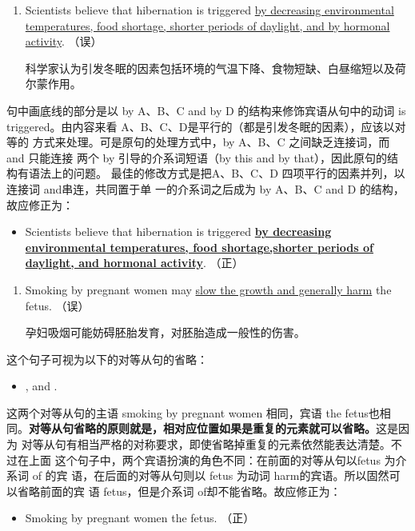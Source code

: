 \begin{enumerate}[resume]
\item Scientists believe that hibernation is triggered \uline{by decreasing
  environmental temperatures, food shortage, shorter periods of daylight,
  and by hormonal activity}. （误）

  科学家认为引发冬眠的因素包括环境的气温下降、食物短缺、白昼缩短以及荷尔蒙作用。
\end{enumerate}

句中画底线的部分是以 by A、B、C and by D 的结构来修饰宾语从句中的动词 is
triggered。由内容来看 A、B、C、D是平行的（都是引发冬眠的因素），应该以对等的
方式来处理。可是原句的处理方式中，by A、B、C 之间缺乏连接词，而 and 只能连接
两个 by 引导的介系词短语（by this and by that），因此原句的结构有语法上的问题。
最佳的修改方式是把A、B、C、D 四项平行的因素并列，以连接词 and串连，共同置于单
一的介系词之后成为 by A、B、C and D 的结构，故应修正为：
\begin{mybox}

\begin{itemize}
\item Scientists believe that hibernation is triggered \ul{\textbf{by decreasing
    environmental temperatures, food shortage,shorter periods of daylight,
    and hormonal activity}}. （正）
\end{itemize}
\end{mybox}

\begin{enumerate}[resume]
\item Smoking by pregnant women may \ul{slow the growth and generally harm} the
  fetus. （误）

  孕妇吸烟可能妨碍胚胎发育，对胚胎造成一般性的伤害。
\end{enumerate}
这个句子可视为以下的对等从句的省略：
\begin{itemize}
\item {}  , and  .
\end{itemize}

这两个对等从句的主语 smoking by pregnant women 相同，宾语 the fetus也相
同。\textbf{对等从句省略的原则就是，相对应位置如果是重复的元素就可以省略。}这是因为
对等从句有相当严格的对称要求，即使省略掉重复的元素依然能表达清楚。不过在上面
这个句子中，两个宾语扮演的角色不同：在前面的对等从句以fetus 为介系词 of 的宾
语，在后面的对等从句则以 fetus 为动词 harm的宾语。所以固然可以省略前面的宾
语 fetus，但是介系词 of却不能省略。故应修正为：
\begin{mybox}

\begin{itemize}
\item Smoking by pregnant women  the
  fetus. （正）
\end{itemize}
\end{mybox}

